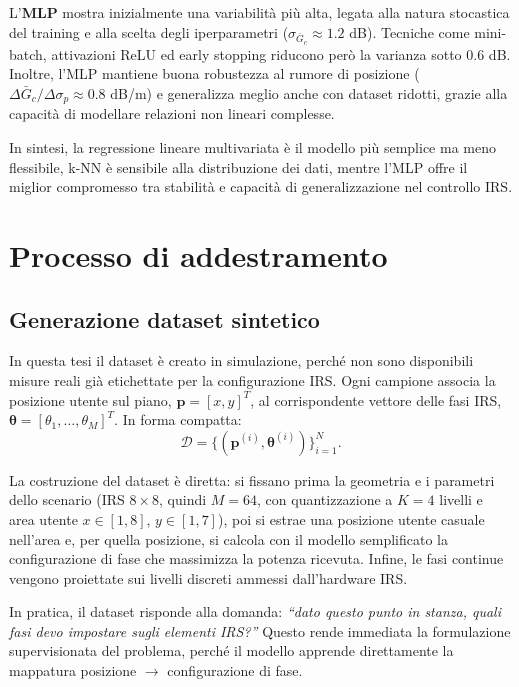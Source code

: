 \documentclass[12pt,a4paper]{report}
\begin{document}
L'\textbf{MLP} mostra inizialmente una variabilità più alta, legata
alla natura stocastica del training e alla scelta degli iperparametri
($\sigma_{\bar{G}_c} \approx 1.2$ dB). Tecniche come mini-batch,
attivazioni ReLU ed early stopping riducono però la varianza sotto
$0.6$ dB. Inoltre, l'MLP mantiene buona robustezza al rumore di
posizione ($\Delta \bar{G}_c / \Delta \sigma_p \approx 0.8$ dB/m) e
generalizza meglio anche con dataset ridotti, grazie alla capacità di
modellare relazioni non lineari complesse.

In sintesi, la regressione lineare multivariata è il modello più
semplice ma meno flessibile, k-NN è sensibile alla distribuzione dei
dati, mentre l'MLP offre il miglior compromesso tra stabilità e
capacità di generalizzazione nel controllo IRS.

\chapter{Processo di addestramento}
\label{chap:addestramento}

\section{Generazione dataset sintetico}
In questa tesi il dataset è creato in simulazione, perché non sono
disponibili misure reali già etichettate per la configurazione IRS.
Ogni campione associa la posizione utente sul piano,
$\mathbf{p}=[x,y]^T$, al corrispondente vettore delle fasi IRS,
$\boldsymbol{\theta}=[\theta_1,\dots,\theta_M]^T$. In forma compatta:
\begin{equation}
  \mathcal{D}=\{(\mathbf{p}^{(i)},\boldsymbol{\theta}^{(i)})\}_{i=1}^{N}.
\end{equation}

La costruzione del dataset è diretta: si fissano prima la geometria e
i parametri dello scenario (IRS $8\times 8$, quindi $M=64$, con
  quantizzazione a $K=4$ livelli e area utente $x\in[1,8]$,
$y\in[1,7]$), poi si estrae una posizione utente casuale nell'area e,
per quella posizione, si calcola con il modello semplificato la
configurazione di fase che massimizza la potenza ricevuta. Infine, le
fasi continue vengono proiettate sui livelli discreti ammessi dall'hardware IRS.

In pratica, il dataset risponde alla domanda: \emph{``dato questo
punto in stanza, quali fasi devo impostare sugli elementi IRS?''}
Questo rende immediata la formulazione supervisionata del problema,
perché il modello apprende direttamente la mappatura posizione
$\rightarrow$ configurazione di fase.
\end{document}

